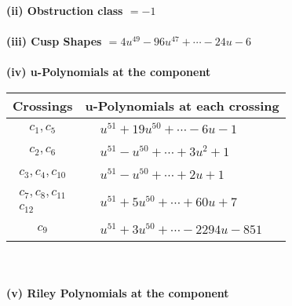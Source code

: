 \documentclass[1p]{elsarticle_modified}
\theoremstyle{definition}
\begin{document}
\flushleft \textbf{(ii) Obstruction class $= -1$}\\~\\
\flushleft \textbf{(iii) Cusp Shapes $= 4 u^{49}-96 u^{47}+\cdots-24 u-6$}\\~\\
\newpage\renewcommand{\arraystretch}{1}
\flushleft \textbf{(iv) u-Polynomials at the component}\newline \\
\begin{tabular}{m{50pt}|m{274pt}}
Crossings & \hspace{64pt}u-Polynomials at each crossing \\
\hline $$\begin{aligned}c_{1},c_{5}\end{aligned}$$&$\begin{aligned}
&u^{51}+19 u^{50}+\cdots-6 u-1
\end{aligned}$\\
\hline $$\begin{aligned}c_{2},c_{6}\end{aligned}$$&$\begin{aligned}
&u^{51}- u^{50}+\cdots+3 u^2+1
\end{aligned}$\\
\hline $$\begin{aligned}c_{3},c_{4},c_{10}\end{aligned}$$&$\begin{aligned}
&u^{51}- u^{50}+\cdots+2 u+1
\end{aligned}$\\
\hline $$\begin{aligned}c_{7},c_{8},c_{11}\\c_{12}\end{aligned}$$&$\begin{aligned}
&u^{51}+5 u^{50}+\cdots+60 u+7
\end{aligned}$\\
\hline $$\begin{aligned}c_{9}\end{aligned}$$&$\begin{aligned}
&u^{51}+3 u^{50}+\cdots-2294 u-851
\end{aligned}$\\
\hline
\end{tabular}\\~\\
\newpage\renewcommand{\arraystretch}{1}
\flushleft \textbf{(v) Riley Polynomials at the component}\newline \\
\end{document}
